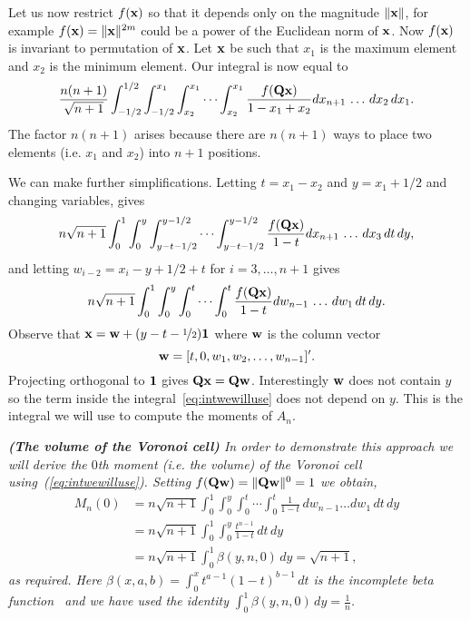 \documentclass[journal, onecolumn, 11pt]{IEEEtran}
\begin{document}
Let us now restrict $f(\mathbf{x})$ so that it depends only on the magnitude $\|\mathbf{x}\|$, for example $f(\mathbf{x}) = \|\mathbf{x}\|^{2m}$ could be a power of the Euclidean norm of $\mathbf{x}$.  Now $f(\mathbf{x})$ is invariant to permutation of $\mathbf{x}$.  Let $\mathbf{x}$ be such that $x_1$ is the maximum element and $x_2$ is the minimum element.  Our integral is now equal to
\[
\frac{n (n+1)}{\sqrt{n+1}} \int^{1/2}_{-1/2} \int^{x_1}_{-1/2}  \int^{x_1}_{x_2} \cdots \int^{x_1}_{x_2} \frac{f(\mathbf{Q}\mathbf{x})}{1 - x_{1} + x_{2}}  dx_{n+1} \, \dots \, dx_2 \, dx_1.
\]
The factor $n(n+1)$ arises because there are $n(n+1)$ ways to place two elements (i.e. $x_1$ and $x_2$) into $n+1$ positions.

We can make further simplifications.  Letting $t = x_1 - x_2$ and $y = x_1 + 1/2$ and changing variables, gives
\[
n \sqrt{n+1} \int^{1}_{0} \int^{y}_{0}  \int^{y - 1/2}_{y - t - 1/2} \cdots \int^{y-1/2}_{y-t-1/2} \frac{f(\mathbf{Q}\mathbf{x} )}{1 - t}  dx_{n+1} \, \dots \, dx_3 \, dt \, dy,
\]
and letting $w_{i-2} = x_i - y + 1/2 + t$ for $i = 3,\dots,n+1$ gives
\begin{equation}\label{eq:intwewilluse}
n \sqrt{n+1} \int^{1}_{0} \int^{y}_{0}  \int^{t}_{0} \cdots \int^{t}_{0} \frac{f(\Qbf\xbf )}{1 - t}  dw_{n-1} \, \dots \, dw_1 \, dt \, dy.
\end{equation}
Observe that $\mathbf{x} = \mathbf{w} + (y - t - \nicefrac{1}{2})\boldsymbol{1}$ where $\mathbf{w}$ is the column vector
\[
\mathbf{w} = [t, 0, w_1, w_2, \dots, w_{n-1}]^\prime.
\]
Projecting orthogonal to $\boldsymbol{1}$ gives $\mathbf{Q}\mathbf{x} = \mathbf{Q} \mathbf{w}$.  Interestingly $\mathbf{w}$ does not contain $y$ so the term inside the integral~\eqref{eq:intwewilluse} does not depend on $y$.  This is the integral we will use to compute the moments of $A_n$.

\begin{example}\emph{\textbf{(The volume of the Voronoi cell)}
In order to demonstrate this approach we will derive the $0$th moment (i.e. the volume) of the Voronoi cell using~(\ref{eq:intwewilluse}).  Setting $f(\mathbf{Q}\mathbf{w}) = \|\mathbf{Q}\mathbf{w}\|^0 = 1$ we obtain,
\begin{align*}
M_n(0) &= n\sqrt{n+1} \int^{1}_{0} \int^{y}_{0} \int^{t}_{0} \cdots \int^{t}_{0} \frac{1}{1 - t} \,dw_{n-1}\dots dw_1 \, dt  \, dy\\
 &= n\sqrt{n+1} \int_{0}^{1} \int^{y}_{0} \frac{t^{n-1}}{1 - t} \, dt  \, dy \\
&= n\sqrt{n+1}  \int^{1}_{0} \beta(y, n, 0) \, dy = \sqrt{n+1},
\end{align*}
as required.  Here $\beta(x,a,b) =  \int_{0}^{x}  t^{a-1}(1 - t)^{b-1} \,dt$ is the incomplete beta function~\cite{Pearson_tables_of_beta_functions} and we have used the identity $\int^{1}_{0} \beta(y, n, 0) \, dy = \frac{1}{n}$.}
\end{example}
\end{document}
